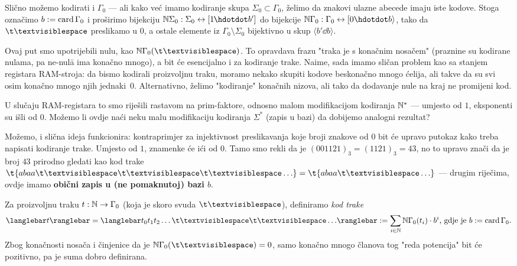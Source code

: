 Slično možemo kodirati i $\Gamma_0$ --- ali kako već imamo kodiranje skupa $\Sigma_0\subset\Gamma_0$, želimo da znakovi ulazne abecede imaju iste kodove. Stoga označimo $b:=\operatorname{card}\Gamma_0$ i proširimo bijekciju $\N\Sigma_0:\Sigma_0\leftrightarrow[1\mspace{-1mu}\dd b']$ do bijekcije $\N\Gamma_0:\Gamma_0\leftrightarrow[0\dd b\rangle$, tako da $\bl$ preslikamo u $0$, a ostale elemente iz $\Gamma_0\!\setminus\Sigma_0$ bijektivno u skup $\langle b'\dd b\rangle$.

Ovaj put smo upotrijebili nulu, kao $\N\Gamma_0(\bl)$. To opravdava frazu "traka je s konačnim nosačem" (praznine su kodirane nulama, pa ne-nul\=a ima konačno mnogo), a bit će esencijalno i za kodiranje trake. Naime, sada imamo sličan problem kao sa stanjem registara RAM-stroja: da bismo kodirali proizvoljnu traku, moramo nekako skupiti kodove beskonačno mnogo ćelija, ali takve da su svi osim konačno mnogo njih jednaki~$0$. Alternativno, želimo "kodiranje" konačnih nizova, ali tako da dodavanje nule na kraj ne promijeni kod.

U slučaju RAM-registara to smo riješili rastavom na prim-faktore, odnosno malom modifikacijom kodiranja ${\mathbb N}^*$ --- umjesto od $1$, eksponenti su išli od $0$. Možemo li ovdje naći neku malu modifikaciju kodiranja $\Sigma^*$ (zapis u bazi) da dobijemo analogni rezultat?

Možemo, i slična ideja funkcionira: kontraprimjer za injektivnost preslikavanja koje broji znakove od $0$ bit će upravo putokaz kako treba napisati kodiranje trake. Umjesto od $1$, znamenke će ići od $0$. Tamo smo rekli da je $(001121)_3=(1121)_3=43$, no to upravo znači da je broj $43$ prirodno gledati kao kod trake $\t{abaa\bl\bl\bl\ldots}=\t{abaa\bl\ldots}$ --- drugim riječima, ovdje imamo \textbf{obični zapis u (ne pomaknutoj$\mspace{1mu}$) bazi $b$}.

\begin{definicija}[{name=[kodiranje trake Turingova stroja]}]
Za proizvoljnu traku $t:{\mathbb N}\to\Gamma_0$ (koja je skoro svuda $\bl$), definiramo \emph{kod trake} \begin{equation}
	\knk{t}=\knk{t_0t_1t_2\ldots\bl\bl\ldots}:=\sum_{i\in\N}\N\Gamma_0(t_i)\cdot b^i\text{, gdje je $b:=\card\Gamma_0$.}
\end{equation}
	Zbog konačnosti nosača i činjenice da je $\N\Gamma_0(\mspace{0.5mu}\bl)=0$, samo konačno mnogo članova tog "reda potencija" bit će pozitivno, pa je suma dobro definirana.
\end{definicija}

